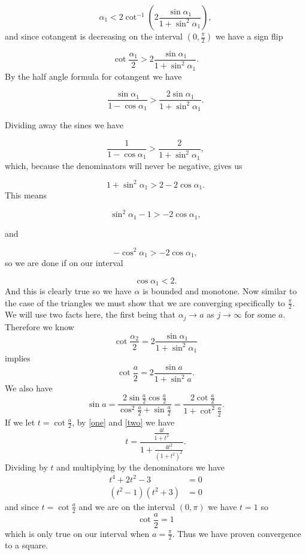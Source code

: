 \documentclass[12pt]{report}
\numberwithin{definition}{section}
\begin{document}
\[
\alpha_1 < 2\cot^{-1}({2\frac{\sin{\alpha_1}}{1+\sin^2{\alpha_1}}}),
\]
and since cotangent is decreasing on the interval $(0, \frac{\pi}{2})$ we have a sign flip

\[
\cot{\frac{\alpha_1}{2}} > 2\frac{\sin{\alpha_1}}{1+\sin^2{\alpha_1}}.
\]
By the half angle formula for cotangent we have 

\[
\frac{\sin{\alpha_1}} {1-\cos{\alpha_1}} > \frac{2\sin{\alpha_1}}{1+\sin^2{\alpha_1}}.
\]

Dividing away the sines we have 

\[
\frac{1} {1-\cos{\alpha_1}} > \frac{2}{1+\sin^2{\alpha_1}},
\]
which, because the denominators will never be negative, gives us 

\[
1+\sin^2{\alpha_1} > 2-2\cos{\alpha_1}.
\]
This means 

\[
\sin^2{\alpha_1}-1 > -2\cos{\alpha_1},
\]

and 

\[
-\cos^2{\alpha_1} > -2\cos{\alpha_1},
\]
so we are done if on our interval 

\[
\cos{\alpha_1} < 2.
\]
And this is clearly true so we have $\alpha$ is bounded and monotone. Now similar to the case of the triangles we must show that we are converging specifically to $\frac{\pi}{2}$. We will use two facts here, the first being that $\alpha_j \rightarrow a$ as $j \rightarrow \infty$ for some $a$. Therefore we know 
\[
\cot{\frac{\alpha_2}{2}} = 2\frac{\sin{\alpha_1}}{1+\sin^2{\alpha_1}}
\]
implies
\begin{equation}\label{one}
\cot{\frac{a}{2}} = 2\frac{\sin{a}}{1+\sin^2{a}}.
\end{equation}
We also have 
\begin{equation}\label{two}
\sin{a} = \frac{2\sin{\frac{a}{2}}\cos{\frac{a}{2}} } {\cos^2{\frac{a}{2}}+\sin{\frac{a}{2}}} = \frac{2\cot{\frac{a}{2}}}{1+\cot^2{\frac{a}{2}}}.
\end{equation}
If we let $t = \cot{\frac{a}{2}}$, by \eqref{one} and \eqref{two} we have 
\[
t = \frac{  \frac{4t}{1+t^2}  } {  1+ \frac{4t^2}{(1+t^2)^2}   }.
\]
Dividing by $t$ and multiplying by the denominators we have 
\begin{align*}
    t^4+2t^2-3 &=0\\
(t^2-1)(t^2+3)&=0
\end{align*}
and since $t =  \cot{\frac{a}{2}}$ and we are on the interval $(0, \pi)$ we have $t=1$ so 
\[
\cot{\frac{a}{2}} = 1
\]
which is only true on our interval when $a = \frac{\pi}{2}$. Thus we have proven convergence to a square. 
\end{document}
